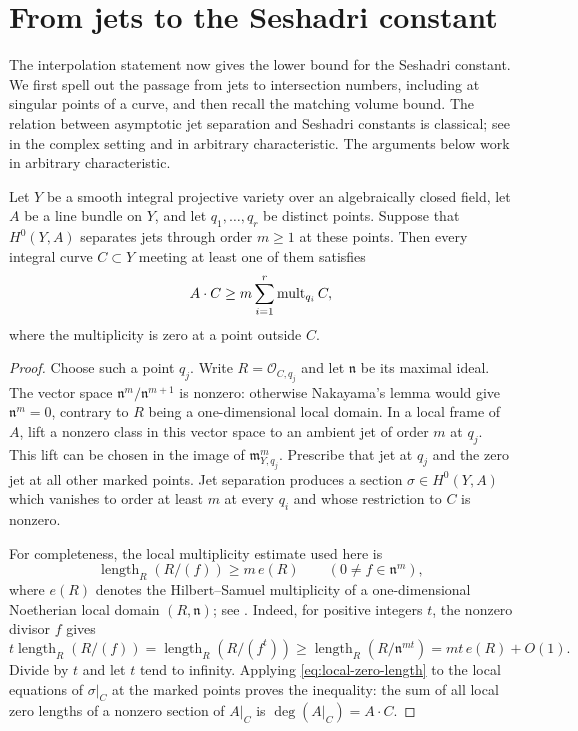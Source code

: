 \section{From jets to the Seshadri constant}\label{sec:positivity}

The interpolation statement now gives the lower bound for the Seshadri constant.  We first spell out the passage from jets to intersection numbers, including at singular points of a curve, and then recall the matching volume bound.  The relation between asymptotic jet separation and Seshadri constants is classical; see \cite[Theorem~6.4]{Demailly1992} in the complex setting and \cite[Section~2, Equation~(2.3)]{MustataSchwede2014} in arbitrary characteristic. The arguments below work in arbitrary characteristic.

\begin{lemma}\label{lem:jet-curve-bound}
Let $Y$ be a smooth integral projective variety over an algebraically closed field, let $A$ be a line bundle on $Y$, and let $q_1,\ldots,q_r$ be distinct points.  Suppose that $H^0(Y,A)$ separates jets through order $m\geq 1$ at these points.  Then every integral curve $C\subset Y$ meeting at least one of them satisfies
\[
 A\cdot C\geq m\sum_{i=1}^r\operatorname{mult}_{q_i}C,
\]
where the multiplicity is zero at a point outside $C$.
\end{lemma}

\begin{proof}
Choose such a point $q_j$.  Write $R=\mathcal{O}_{C,q_j}$ and let $\mathfrak{n}$ be its maximal ideal.  The vector space $\mathfrak{n}^m/\mathfrak{n}^{m+1}$ is nonzero: otherwise Nakayama's lemma would give $\mathfrak{n}^m=0$, contrary to $R$ being a one-dimensional local domain. In a local frame of $A$, lift a nonzero class in this vector space to an ambient jet of order $m$ at $q_j$.  This lift can be chosen in the image of $\mathfrak{m}_{Y,q_j}^m$.  Prescribe that jet at $q_j$ and the zero jet at all other marked points.  Jet separation produces a section $\sigma\in H^0(Y,A)$ which vanishes to order at least $m$ at every $q_i$ and whose restriction to $C$ is nonzero.

For completeness, the local multiplicity estimate used here is
\begin{equation}\label{eq:local-zero-length}
 \operatorname{length}_R(R/(f))\geq m\,e(R)
 \qquad(0\ne f\in\mathfrak{n}^m),
\end{equation}
where $e(R)$ denotes the Hilbert--Samuel multiplicity of a one-dimensional Noetherian local domain $(R,\mathfrak{n})$; see \cite[Definition~43.15.1, Tag~\href{https://stacks.math.columbia.edu/tag/0AZV}{0AZV}]{Stacks}.  Indeed, for positive integers $t$, the nonzero divisor $f$ gives
\[
 t\operatorname{length}_R(R/(f))
 =\operatorname{length}_R(R/(f^t))
 \geq\operatorname{length}_R(R/\mathfrak{n}^{mt})
 =mt\,e(R)+O(1).
\]
Divide by $t$ and let $t$ tend to infinity.  Applying \eqref{eq:local-zero-length} to the local equations of $\sigma|_C$ at the marked points proves the inequality: the sum of all local zero lengths of a nonzero section of $A|_C$ is $\deg(A|_C)=A\cdot C$.
\end{proof}

